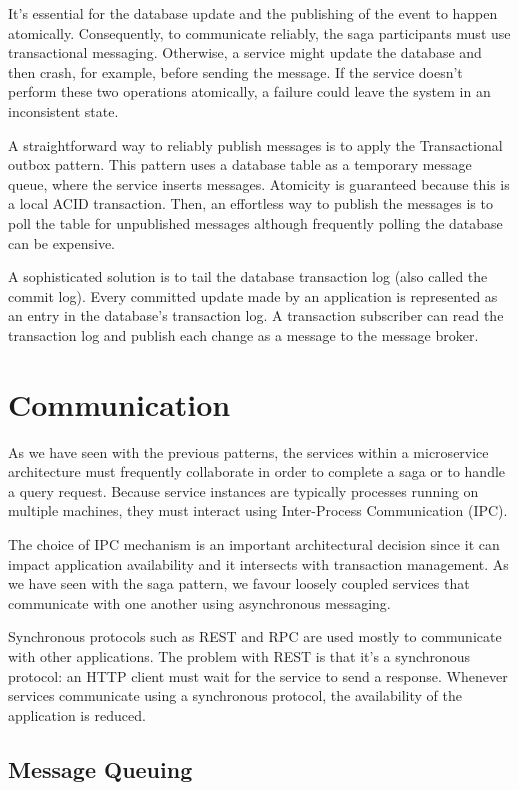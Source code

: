\documentclass[conference]{IEEEtran}
\begin{document}
It’s essential for the database update and the publishing of the event to happen atomically. Consequently, to communicate reliably, the saga participants must use transactional messaging. Otherwise, a service might update the database and then crash, for example, before sending the message. If the service doesn’t perform these two operations atomically, a failure could leave the system in an inconsistent state.

A straightforward way to reliably publish messages is to apply the Transactional outbox pattern. This pattern uses a database table as a temporary message queue, where the service inserts messages. Atomicity is guaranteed because this is a local ACID transaction. Then, an effortless way to publish the messages is to poll the table for unpublished messages although frequently polling the database can be expensive.

A sophisticated solution is to tail the database transaction log (also called the commit log). Every committed update made by an application is represented as an entry in the database’s transaction log. A transaction subscriber can read the transaction log and publish each change as a message to the message broker. \cite{log-tailing}

\section{Communication}

As we have seen with the previous patterns, the services within a microservice architecture must frequently collaborate in order to complete a saga or to handle a query request. Because service instances are typically processes running on multiple machines, they must interact using Inter-Process Communication (IPC).

The choice of IPC mechanism is an important architectural decision since it can impact application availability and it intersects with transaction management. As we have seen with the saga pattern, we favour loosely coupled services that communicate with one another using asynchronous messaging.

Synchronous protocols such as REST and RPC are used mostly to communicate with other applications. The problem with REST is that it’s a synchronous protocol: an HTTP client must wait for the service to send a response. Whenever services communicate using a synchronous protocol, the availability of the application is reduced.

\subsection{Message Queuing}
\end{document}
